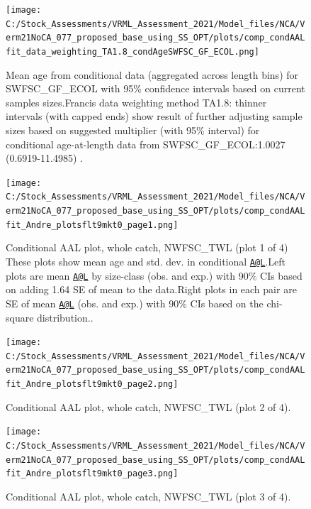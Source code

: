 \documentclass[
  english,
  a4paper,
]{article}
\begin{document}
\begin{figure}
\centering
\texttt{[image: C:/Stock\_Assessments/VRML\_Assessment\_2021/Model\_files/NCA/Verm21NoCA\_077\_proposed\_base\_using\_SS\_OPT/plots/comp\_condAALfit\_data\_weighting\_TA1.8\_condAgeSWFSC\_GF\_ECOL.png]}
\caption{Mean age from conditional data (aggregated across length bins) for SWFSC\_GF\_ECOL with 95\% confidence intervals based on current samples sizes.Francis data weighting method TA1.8: thinner intervals (with capped ends) show result of further adjusting sample sizes based on suggested multiplier (with 95\% interval) for conditional age-at-length data from SWFSC\_GF\_ECOL:1.0027 (0.6919-11.4985) .\label{fig:comp_condAALfit_data_weighting_TA1.8_condAgeSWFSC_GF_ECOL}}
\end{figure}

\begin{figure}
\centering
\texttt{[image: C:/Stock\_Assessments/VRML\_Assessment\_2021/Model\_files/NCA/Verm21NoCA\_077\_proposed\_base\_using\_SS\_OPT/plots/comp\_condAALfit\_Andre\_plotsflt9mkt0\_page1.png]}
\caption{Conditional AAL plot, whole catch, NWFSC\_TWL (plot 1 of 4)
These plots show mean age and std. dev. in conditional \href{mailto:A@L}{\nolinkurl{A@L}}.Left plots are mean \href{mailto:A@L}{\nolinkurl{A@L}} by size-class (obs. and exp.) with 90\% CIs based on adding 1.64 SE of mean to the data.Right plots in each pair are SE of mean \href{mailto:A@L}{\nolinkurl{A@L}} (obs. and exp.) with 90\% CIs based on the chi-square distribution..\label{fig:comp_condAALfit_Andre_plotsflt9mkt0_page1}}
\end{figure}

\begin{figure}
\centering
\texttt{[image: C:/Stock\_Assessments/VRML\_Assessment\_2021/Model\_files/NCA/Verm21NoCA\_077\_proposed\_base\_using\_SS\_OPT/plots/comp\_condAALfit\_Andre\_plotsflt9mkt0\_page2.png]}
\caption{Conditional AAL plot, whole catch, NWFSC\_TWL (plot 2 of 4).\label{fig:comp_condAALfit_Andre_plotsflt9mkt0_page2}}
\end{figure}

\begin{figure}
\centering
\texttt{[image: C:/Stock\_Assessments/VRML\_Assessment\_2021/Model\_files/NCA/Verm21NoCA\_077\_proposed\_base\_using\_SS\_OPT/plots/comp\_condAALfit\_Andre\_plotsflt9mkt0\_page3.png]}
\caption{Conditional AAL plot, whole catch, NWFSC\_TWL (plot 3 of 4).\label{fig:comp_condAALfit_Andre_plotsflt9mkt0_page3}}
\end{figure}
\end{document}

